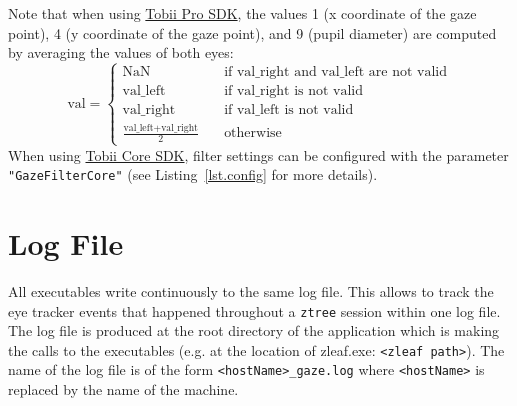 \documentclass[a4paper,oneside]{book}
\begin{document}
Note that when using \href{http://developer.tobii.com/tobii-pro-sdk/}{Tobii Pro SDK}, the values 1 (x coordinate of the gaze point), 4 (y coordinate of the gaze point), and 9 (pupil diameter) are computed by averaging the values of both eyes:
\begin{displaymath}
    \text{val} =
        \begin{cases}
            \text{NaN}                                      & \quad \text{if val\_right and val\_left are not valid}\\
            \text{val\_left}                                & \quad \text{if val\_right is not valid}\\
            \text{val\_right}                               & \quad \text{if val\_left is not valid}\\
            \frac{\text{val\_left} + \text{val\_right}}{2}  & \quad \text{otherwise}
        \end{cases}
\end{displaymath}
When using \href{http://developer.tobii.com/tobii-core-sdk/}{Tobii Core SDK}, filter settings can be configured with the parameter \texttt{"GazeFilterCore"} (see Listing~\ref{lst.config} for more details).

\section{Log File}
All executables write continuously to the same log file.
This allows to track the eye tracker events that happened throughout a \texttt{ztree} session within one log file.
The log file is produced at the root directory of the application which is making the calls to the executables (e.g. at the location of zleaf.exe: \texttt{<zleaf path>}).
The name of the log file is of the form \texttt{<hostName>\_gaze.log} where \texttt{<hostName>} is replaced by the name of the machine.
\end{document}
